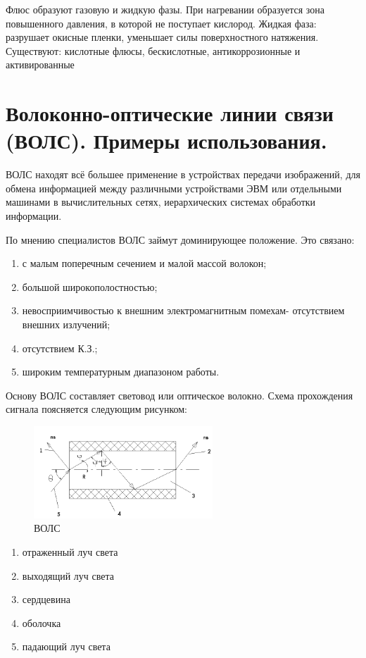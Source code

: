 \documentclass[unicode, 12pt, a4paper, oneside]{article}
\begin{document}
Флюс образуют газовую и жидкую фазы. При нагревании образуется зона повышенного давления, в которой не поступает кислород. Жидкая фаза: разрушает окисные пленки, уменьшает силы поверхностного натяжения.
Существуют: кислотные флюсы, бескислотные, антикоррозионные и активированные

\section{Волоконно-оптические линии связи (ВОЛС). Примеры использования.}

ВОЛС находят всё большее применение в устройствах передачи изображений, для обмена информацией между различными устройствами ЭВМ или отдельными машинами в вычислительных сетях, иерархических системах обработки информации.

По мнению специалистов ВОЛС займут доминирующее положение. Это связано:

\begin{enumerate} 
\item с малым поперечным сечением и малой массой волокон;
\item большой широкополостностью;
\item невосприимчивостью к внешним электромагнитным помехам- отсутствием внешних излучений;
\item отсутствием К.З.;
\item широким температурным диапазоном работы.
\end{enumerate}

Основу ВОЛС составляет световод или оптическое волокно. Схема прохождения сигнала поясняется следующим рисунком:

\begin{figure}[H]
\centering
\includegraphics[width=0.6\textwidth]{77_opvol.png}
\caption{ВОЛС}
\end{figure}
\begin{enumerate} 
\item отраженный луч света
\item выходящий луч света
\item сердцевина
\item оболочка
\item падающий луч света
\end{enumerate} 
\end{document}
